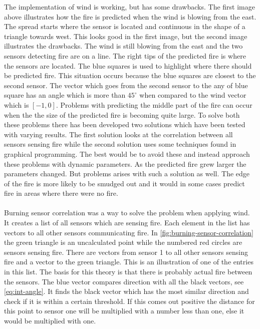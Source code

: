 The implementation of wind is working, but has some drawbacks. The first image above illustrates how the fire is predicted when the wind is blowing from the east. The spread starts where the sensor is located and continuous in the shape of a triangle towards west. This looks good in the first image, but the second image illustrates the drawbacks. The wind is still blowing from the east and the two sensors detecting fire are on a line. The right tips of the predicted fire is where the sensors are located. The blue squares is used to highlight where there should be predicted fire. This situation occurs because the blue squares are closest to the second sensor. The vector which goes from the second sensor to the any of blue square has an angle which is more than $ 45^{\circ} $ when compared to the wind vector which is $ \left[-1,0\right] $. Problems with predicting the middle part of the fire can occur when the the size of the predicted fire is becoming quite large. To solve both these problems there has been developed two solutions which have been tested with varying results. The first solution looks at the correlation between all sensors sensing fire while the second solution uses some techniques found in graphical programming. The best would be to avoid these and instead approach these problems with dynamic parameters. As the predicted fire grew larger the parameters changed. But problems arises with such a solution as well. The edge of the fire is more likely to be smudged out and it would in some cases predict fire in areas where there were no fire.
\\\\
Burning sensor correlation was a way to solve the problem when applying wind. It creates a list of all sensors which are sensing fire. Each element in the list has vectors to all other sensors communicating fire. In \ref{fig:burning-sensor-correlation} the green triangle is an uncalculated point while the numbered red circles are sensors sensing fire. There are vectors from sensor 1 to all other sensors sensing fire and a vector to the green triangle. This is an illustration of one of the entries in this list. The basis for this theory is that there is probably actual fire between the sensors. The blue vector compares direction with all the black vectors, see \ref{eq:int-angle}. It finds the black vector which has the most similar direction and check if it is within a certain threshold. If this comes out positive the distance for this point to sensor one will be multiplied with a number less than one, else it would be multiplied with one.
